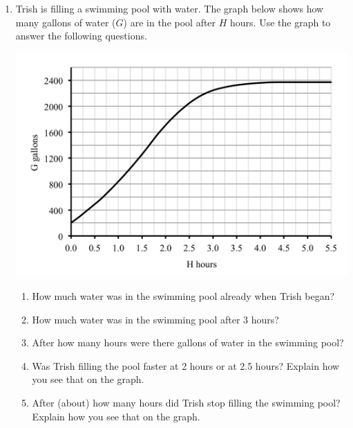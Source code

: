 \documentclass[12pt]{article}
\begin{document}
\begin{enumerate}
\item Trish is filling a swimming pool with water.  The graph below shows how many gallons of water ($G$) are in the pool after $H$ hours.  Use the graph to answer the following questions.
\begin{center}
 {\includegraphics [width = 6in] {fillingtankNEW}}
\end{center} 
\begin{enumerate}
\item How much water was in the swimming pool already when Trish began? \vfill
\item How much water was in the swimming pool after 3 hours? \vfill
\item After how many hours were there  gallons of water in the swimming pool? \vfill
\item Was Trish filling the pool faster at 2 hours or at 2.5 hours?  Explain how you see that on the graph. \vfill
\item After (about) how many hours did Trish stop filling the swimming pool?  Explain how you see that on the graph. \vfill
\end{enumerate}

\newpage


\end{enumerate}
\end{document}
